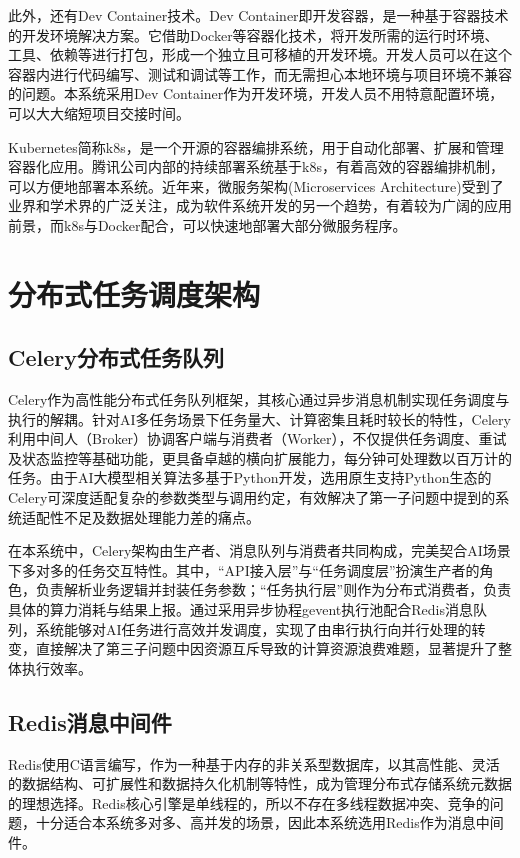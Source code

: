 此外，还有Dev Container技术。Dev Container即开发容器，是一种基于容器技术的开发环境解决方案。它借助Docker等容器化技术，将开发所需的运行时环境、工具、依赖等进行打包，形成一个独立且可移植的开发环境。开发人员可以在这个容器内进行代码编写、测试和调试等工作，而无需担心本地环境与项目环境不兼容的问题。本系统采用Dev Container作为开发环境，开发人员不用特意配置环境，可以大大缩短项目交接时间。

Kubernetes简称k8s，是一个开源的容器编排系统，用于自动化部署、扩展和管理容器化应用\cite{8}。腾讯公司内部的持续部署系统基于k8s，有着高效的容器编排机制，可以方便地部署本系统。近年来，微服务架构(Microservices Architecture)受到了业界和学术界的广泛关注，成为软件系统开发的另一个趋势，有着较为广阔的应用前景\cite{7}，而k8s与Docker配合，可以快速地部署大部分微服务程序。

\section{分布式任务调度架构}

\subsection{Celery分布式任务队列}

Celery作为高性能分布式任务队列框架，其核心通过异步消息机制实现任务调度与执行的解耦。针对AI多任务场景下任务量大、计算密集且耗时较长的特性，Celery利用中间人（Broker）协调客户端与消费者（Worker），不仅提供任务调度、重试及状态监控等基础功能，更具备卓越的横向扩展能力，每分钟可处理数以百万计的任务。由于AI大模型相关算法多基于Python开发，选用原生支持Python生态的Celery可深度适配复杂的参数类型与调用约定，有效解决了第一子问题中提到的系统适配性不足及数据处理能力差的痛点。

在本系统中，Celery架构由生产者、消息队列与消费者共同构成，完美契合AI场景下多对多的任务交互特性。其中，“API接入层”与“任务调度层”扮演生产者的角色，负责解析业务逻辑并封装任务参数；“任务执行层”则作为分布式消费者，负责具体的算力消耗与结果上报。通过采用异步协程gevent执行池配合Redis消息队列，系统能够对AI任务进行高效并发调度，实现了由串行执行向并行处理的转变，直接解决了第三子问题中因资源互斥导致的计算资源浪费难题，显著提升了整体执行效率\cite{14}。

\subsection{Redis消息中间件}

Redis使用C语言编写，作为一种基于内存的非关系型数据库，以其高性能、灵活的数据结构、可扩展性和数据持久化机制等特性，成为管理分布式存储系统元数据的理想选择\cite{16, yin2025}。Redis核心引擎是单线程的，所以不存在多线程数据冲突、竞争的问题，十分适合本系统多对多、高并发的场景，因此本系统选用Redis作为消息中间件。

